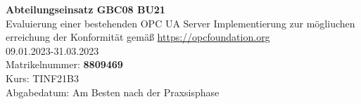 \documentclass[
  ngerman
  ,a4paper
  ,12pt
  ,pdftex
]{article}
\begin{document}
\begin{titlepage}
  \begin{center}
      {\Huge \textbf{Abteilungseinsatz GBC08 BU21}}\\[1.5cm]
      {\Large Evaluierung einer bestehenden OPC UA Server Implementierung zur mögliuchen erreichung der Konformität gemäß \href{https://opcfoundation.org/developer-tools/certification-test-tools/opc-ua-compliance-test-tool-uactt/}{https://opcfoundation.org}}\\[1cm]
      {\Huge 09.01.2023-31.03.2023}\\[7cm]
      {\large Matrikelnummer: \textbf{8809469}}\\[0.5cm]
     
      {\large Kurs: TINF21B3}\\[0.5cm]
      {\large Abgabedatum: Am Besten nach der Praxsisphase}
      \vfill
  \end{center}
\end{titlepage}
\newpage
\tableofcontents
\newpage





\end{document}
